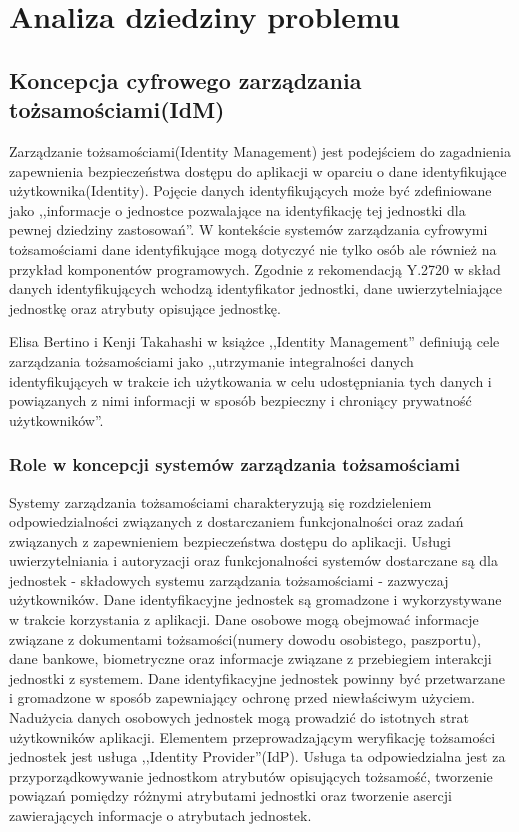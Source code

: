 \chapter{Analiza dziedziny problemu}
\label{cha:analizaDziedzinyProblemu}


\section{Koncepcja cyfrowego zarządzania tożsamościami(IdM)}
\label{sec:konceptcjaIdM}

	Zarządzanie tożsamościami(Identity Management) jest podejściem do zagadnienia zapewnienia bezpieczeństwa dostępu do aplikacji w oparciu o dane identyfikujące użytkownika(Identity). Pojęcie danych identyfikujących może być zdefiniowane jako ,,informacje o jednostce pozwalające na identyfikację tej jednostki dla pewnej dziedziny zastosowań''\cite{Itu09}. W kontekście systemów zarządzania cyfrowymi tożsamościami dane identyfikujące mogą dotyczyć nie tylko osób ale również na przykład komponentów programowych\cite{Bertino11}. Zgodnie z rekomendacją Y.2720 w skład danych identyfikujących wchodzą identyfikator jednostki, dane uwierzytelniające jednostkę oraz atrybuty opisujące jednostkę\cite{Itu09}.

	Elisa Bertino i Kenji Takahashi w książce ,,Identity Management'' definiują cele zarządzania tożsamościami jako ,,utrzymanie integralności danych identyfikujących w trakcie ich użytkowania w celu udostępniania tych danych i powiązanych z nimi informacji w sposób bezpieczny i chroniący prywatność użytkowników''\cite{Bertino11}.
	 
	\subsection{Role w koncepcji systemów zarządzania tożsamościami}

		Systemy zarządzania tożsamościami charakteryzują się rozdzieleniem odpowiedzialności związanych z dostarczaniem funkcjonalności oraz zadań związanych z zapewnieniem bezpieczeństwa dostępu do aplikacji. Usługi uwierzytelniania i autoryzacji oraz funkcjonalności systemów dostarczane są dla jednostek - składowych systemu zarządzania tożsamościami - zazwyczaj użytkowników.
		Dane identyfikacyjne jednostek są gromadzone i wykorzystywane w trakcie korzystania z aplikacji. Dane osobowe mogą obejmować informacje związane z dokumentami tożsamości(numery dowodu osobistego, paszportu), dane bankowe, biometryczne oraz informacje związane z przebiegiem interakcji jednostki z systemem. Dane identyfikacyjne jednostek powinny być przetwarzane i gromadzone w sposób zapewniający  ochronę przed niewłaściwym użyciem. Nadużycia danych osobowych jednostek mogą prowadzić do istotnych strat użytkowników aplikacji.
		Elementem przeprowadzającym weryfikację tożsamości jednostek jest usługa ,,Identity Provider''(IdP). Usługa ta odpowiedzialna jest za przyporządkowywanie jednostkom atrybutów opisujących tożsamość, tworzenie powiązań pomiędzy różnymi atrybutami jednostki oraz tworzenie asercji zawierających informacje o atrybutach jednostek. 

